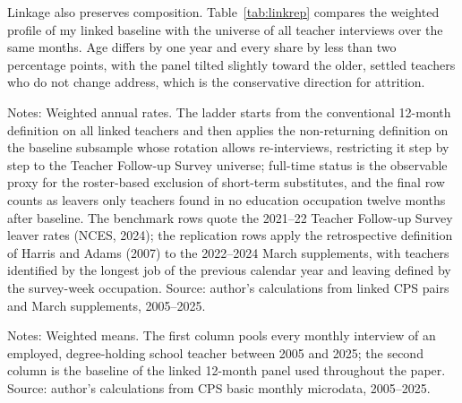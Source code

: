 \documentclass[11pt,a4paper]{article}
\newcommand{\fignote}[1]{\par\vspace{4pt}%
  \begin{minipage}{\linewidth}\footnotesize\color{ecgray}#1\end{minipage}}
\begin{document}
Linkage also preserves composition. Table~\ref{tab:linkrep} compares the
weighted profile of my linked baseline with the universe of all teacher
interviews over the same months. Age differs by one year and every share
by less than two percentage points, with the panel tilted slightly toward
the older, settled teachers who do not change address, which is the
conservative direction for attrition.

\begin{table}[htbp]
  \caption{From this paper's definitions to the published benchmarks.}
  \label{tab:reconcile}
  \centering\small
  
  \fignote{Notes: Weighted annual rates. The ladder starts from the
  conventional 12-month definition on all linked teachers and then applies
  the non-returning definition on the baseline subsample whose rotation
  allows re-interviews, restricting it step by step to the Teacher
  Follow-up Survey universe; full-time status is the observable proxy for
  the roster-based exclusion of short-term substitutes, and the final row
  counts as leavers only teachers found in no education occupation twelve
  months after baseline. The benchmark rows quote the 2021--22 Teacher
  Follow-up Survey leaver rates (NCES, 2024); the replication rows apply
  the retrospective definition of Harris and Adams (2007) to the
  2022--2024 March supplements, with teachers identified by the longest
  job of the previous calendar year and leaving defined by the survey-week
  occupation. Source: author's calculations from linked CPS pairs and
  March supplements, 2005--2025.}
\end{table}

\begin{table}[htbp]
  \caption{Composition of the linked panel vs all teacher interviews.}
  \label{tab:linkrep}
  \centering\small
  
  \fignote{Notes: Weighted means. The first column pools every monthly
  interview of an employed, degree-holding school teacher between 2005 and
  2025; the second column is the baseline of the linked 12-month panel
  used throughout the paper. Source: author's calculations from CPS basic
  monthly microdata, 2005--2025.}
\end{table}
\end{document}
